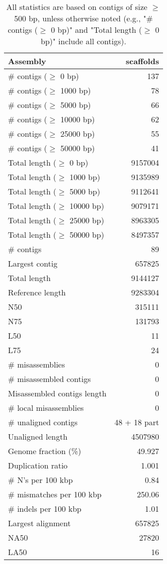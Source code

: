 \documentclass[12pt,a4paper]{article}
\begin{document}
\begin{table}[ht]
\begin{center}
\caption{All statistics are based on contigs of size $\geq$ 500 bp, unless otherwise noted (e.g., "\# contigs ($\geq$ 0 bp)" and "Total length ($\geq$ 0 bp)" include all contigs).}
\begin{tabular}{|l*{1}{|r}|}
\hline
Assembly & scaffolds \\ \hline
\# contigs ($\geq$ 0 bp) & 137 \\ \hline
\# contigs ($\geq$ 1000 bp) & 78 \\ \hline
\# contigs ($\geq$ 5000 bp) & 66 \\ \hline
\# contigs ($\geq$ 10000 bp) & 62 \\ \hline
\# contigs ($\geq$ 25000 bp) & 55 \\ \hline
\# contigs ($\geq$ 50000 bp) & 41 \\ \hline
Total length ($\geq$ 0 bp) & 9157004 \\ \hline
Total length ($\geq$ 1000 bp) & 9135989 \\ \hline
Total length ($\geq$ 5000 bp) & 9112641 \\ \hline
Total length ($\geq$ 10000 bp) & 9079171 \\ \hline
Total length ($\geq$ 25000 bp) & 8963305 \\ \hline
Total length ($\geq$ 50000 bp) & 8497357 \\ \hline
\# contigs & 89 \\ \hline
Largest contig & 657825 \\ \hline
Total length & 9144127 \\ \hline
Reference length & 9283304 \\ \hline
N50 & 315111 \\ \hline
N75 & 131793 \\ \hline
L50 & 11 \\ \hline
L75 & 24 \\ \hline
\# misassemblies & 0 \\ \hline
\# misassembled contigs & 0 \\ \hline
Misassembled contigs length & 0 \\ \hline
\# local misassemblies & 0 \\ \hline
\# unaligned contigs & 48 + 18 part \\ \hline
Unaligned length & 4507980 \\ \hline
Genome fraction (\%) & 49.927 \\ \hline
Duplication ratio & 1.001 \\ \hline
\# N's per 100 kbp & 0.84 \\ \hline
\# mismatches per 100 kbp & 250.06 \\ \hline
\# indels per 100 kbp & 1.01 \\ \hline
Largest alignment & 657825 \\ \hline
NA50 & 27820 \\ \hline
LA50 & 16 \\ \hline
\end{tabular}
\end{center}
\end{table}
\end{document}
